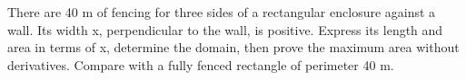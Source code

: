 \documentclass[11pt]{article}
\begin{document}
There are 40 m of fencing for three sides of a rectangular enclosure against a wall. Its width x, perpendicular to the wall, is positive. Express its length and area in terms of x, determine the domain, then prove the maximum area without derivatives. Compare with a fully fenced rectangle of perimeter 40 m.\par
\vspace{5pt}
\end{document}
